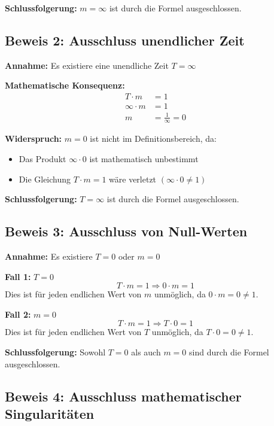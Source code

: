 \textbf{Schlussfolgerung:} $m = \infty$ ist durch die Formel ausgeschlossen.

\subsection{Beweis 2: Ausschluss unendlicher Zeit}

\textbf{Annahme:} Es existiere eine unendliche Zeit $T = \infty$

\textbf{Mathematische Konsequenz:}
\begin{align}
	T \cdot m &= 1\\
	\infty \cdot m &= 1\\
	m &= \frac{1}{\infty} = 0
\end{align}

\textbf{Widerspruch:} $m = 0$ ist nicht im Definitionsbereich, da:
\begin{itemize}
	\item Das Produkt $\infty \cdot 0$ ist mathematisch unbestimmt
	\item Die Gleichung $T \cdot m = 1$ wäre verletzt $(\infty \cdot 0 \neq 1)$
\end{itemize}

\textbf{Schlussfolgerung:} $T = \infty$ ist durch die Formel ausgeschlossen.

\subsection{Beweis 3: Ausschluss von Null-Werten}

\textbf{Annahme:} Es existiere $T = 0$ oder $m = 0$

\textbf{Fall 1:} $T = 0$
\begin{equation}
	T \cdot m = 1 \Rightarrow 0 \cdot m = 1
\end{equation}
Dies ist für jeden endlichen Wert von $m$ unmöglich, da $0 \cdot m = 0 \neq 1$.

\textbf{Fall 2:} $m = 0$
\begin{equation}
	T \cdot m = 1 \Rightarrow T \cdot 0 = 1
\end{equation}
Dies ist für jeden endlichen Wert von $T$ unmöglich, da $T \cdot 0 = 0 \neq 1$.

\textbf{Schlussfolgerung:} Sowohl $T = 0$ als auch $m = 0$ sind durch die Formel ausgeschlossen.

\subsection{Beweis 4: Ausschluss mathematischer Singularitäten}

